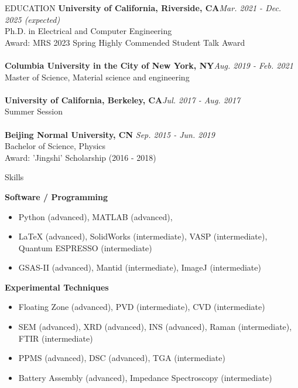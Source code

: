\documentclass{resume} %
\begin{document}

\begin{rSection}{EDUCATION}
{\bf University of California, Riverside, CA}\hfill{\em Mar. 2021 - Dec. 2025 (expected)}
\\ Ph.D. in Electrical and Computer Engineering
\\ Award: MRS 2023 Spring Highly Commended Student Talk Award
\\
\\{\bf Columbia University in the City of New York, NY}\hfill{\em Aug. 2019 - Feb. 2021} 
\\ Master of Science, Material science and engineering
\\
\\{\bf University of California, Berkeley, CA}\hfill{\em Jul. 2017 - Aug. 2017}
\\ Summer Session
\\
\\{\bf Beijing Normal University, CN} \hfill {\em Sep. 2015 - Jun. 2019} 
\\ Bachelor of Science, Physics
\\ Award: 'Jingshi' Scholarship (2016 - 2018)

\end{rSection}


\begin{rSection}{Skills }

	\textbf{Software / Programming}
\begin{itemize}
    \item Python (advanced), MATLAB (advanced), 
    \item LaTeX (advanced), SolidWorks (intermediate), VASP (intermediate), Quantum ESPRESSO (intermediate)
    \item GSAS-II (advanced), Mantid (intermediate), ImageJ (intermediate)
\end{itemize}

	\textbf{Experimental Techniques}
\begin{itemize}
    \item Floating Zone (advanced), PVD (intermediate), CVD (intermediate)
    \item SEM (advanced), XRD (advanced), INS (advanced), Raman (intermediate), FTIR (intermediate)
    \item PPMS (advanced), DSC (advanced), TGA (intermediate)
    \item Battery Assembly (advanced), Impedance Spectroscopy (intermediate)
\end{itemize}

\end{rSection}
\end{document}
